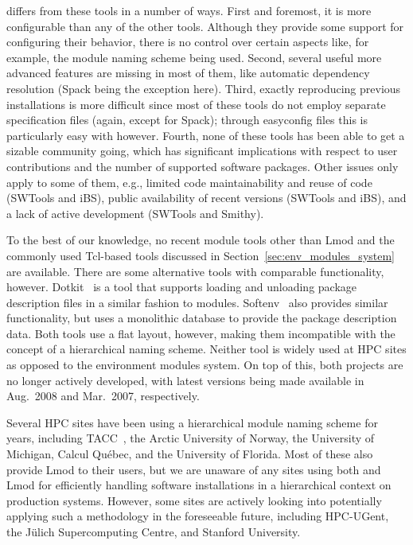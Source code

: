 \easybuild{} differs from these tools in a number of ways. First and foremost, it is
more configurable than any of the other tools. Although they provide some support
for configuring their behavior, there is no control over certain aspects like, for example, the
module naming scheme being used. Second, several useful more advanced
features are missing in most of them, like automatic dependency resolution (Spack
being the exception here). Third, exactly reproducing previous installations is more
difficult since most of these tools do not employ separate specification files (again,
except for Spack); through easyconfig files this is particularly easy with \easybuild{} however.
Fourth, none of these tools has been able to get a sizable community going, which
has significant implications with respect to user contributions and the number of supported
software packages.
Other issues only apply to some of them, e.g., limited code
maintainability and reuse of code (SWTools and iBS), public availability of recent
versions (SWTools and iBS), and a lack of active development (SWTools and Smithy).

To the best of our knowledge, no recent module tools other than Lmod and the commonly
used Tcl-based tools discussed in Section~\ref{sec:env_modules_system} are
available. There are some alternative tools with comparable functionality, however.
Dotkit~\cite{dotkit} is a tool that supports loading and unloading package description 
files in a similar fashion to modules. Softenv~\cite{softenv} also provides similar
functionality, but uses a monolithic database to provide the package description data.
Both tools use a flat layout, however, making them incompatible with the concept of a
hierarchical naming scheme. Neither tool is widely used at HPC sites as
opposed to the environment modules system. On top of this, both projects are no longer
actively developed, with latest versions being made available in Aug.~2008 and
Mar.~2007, respectively.

Several HPC sites have been using a hierarchical module naming scheme for years,
including TACC~\cite{lmodSC11}, the Arctic University of Norway, the University
of Michigan, Calcul Qu\'ebec, and the University of Florida. Most of these also provide
Lmod to their users, but we are unaware of any sites using both \easybuild{} and Lmod
for efficiently handling software installations in a hierarchical context on
production systems. However, some
sites are actively looking into potentially applying such a methodology in the
foreseeable future, including HPC-UGent, the J\"ulich Supercomputing Centre, and
Stanford University.
